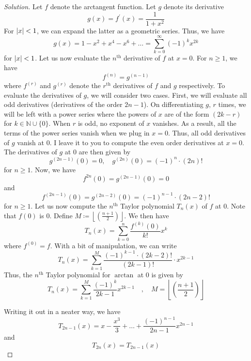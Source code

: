 \documentclass[12pt]{article}
\theoremstyle{definition}
\newenvironment{soln}{\begin{proof}[Solution]}{\end{proof}}
\begin{document}
\begin{enumerate}[leftmargin=*]
    \begin{soln}
        Let $f$ denote the arctangent function. Let $g$ denote its derivative
        \[
            g(x) = f^{\prime}(x) = \frac{1}{1+x^2}
        \]
        For $\abs{x} < 1$, we can expand the latter as a geometric series. Thus, we have
        \[
            g(x) = 1 - x^2 + x^4 - x^6 + \ldots = \sum_{k=0}^{\infty} (-1)^k x^{2k}
        \]
        for $\abs{x} < 1$. Let us now evaluate the $n^{\text{th}}$ derivative of $f$ at $x=0$. For $n \geq 1$, we have
        \[
            f^{(n)} = g^{(n-1)}
        \]
        where $f^{(r)}$ and $g^{(r)}$ denote the $r^{\text{th}}$ derivatives of $f$ and $g$ respectively. To evaluate the derivatives of $g$, we will consider two cases. First, we will evaluate all odd derivatives (derivatives of the order $2n-1$). On differentiating $g$, $r$ times, we will be left with a power series where the powers of $x$ are of the form $(2k-r)$ for $k \in \mathbb{N}\cup\{0\}$. When $r$ is odd, no exponent of $x$ vanishes. As a result, all the terms of the power series vanish when we plug in $x=0$. Thus, all odd derivatives of $g$ vanish at $0$. I leave it to you to compute the even order derivatives at $x=0$. The derivatives of $g$ at $0$ are then given by
        \[
            g^{(2n-1)}(0) = 0, \quad g^{(2n)}(0) = (-1)^n \cdot (2n)!
        \]
        for $n \geq 1$. Now, we have
        \[
            f^{2n}(0) = g^{(2n-1)}(0) = 0
        \]
        and
        \[
            f^{(2n-1)}(0) = g^{(2n-2)}(0) = (-1)^{n-1} \cdot (2n-2)!
        \]
        for $n \geq 1$. Let us now compute the $n^{\text{th}}$ Taylor polynomial $T_n(x)$ of $f$ at $0$. Note that $f(0)$ is $0$. Define $M \coloneqq \left\lfloor \left( \frac{n+1}{2} \right)  \right\rfloor$. We then have
        \[
            T_n(x) = \sum_{k=0}^{n} \frac{f^{(k)}(0)}{k!} x^k
        \]
        where $f^{(0)} = f$. With a bit of manipulation, we can write 
        \[
            T_n(x) = \sum_{k=1}^{M} \frac{(-1)^{k-1} \cdot (2k-2)!}{(2k-1)!} \cdot x^{2k-1}
        \]  
        Thus, the $n^{\text{th}}$ Taylor polynomial for $\arctan$ at $0$ is given by
        \[
            T_n(x) = \sum_{k=1}^{M} \frac{(-1)^k}{2k-1} x^{2k-1} \quad , \quad M = \left\lfloor \left( \frac{n+1}{2} \right) \right\rfloor
        \]
        
        Writing it out in a neater way, we have
        \[
            T_{2n-1}(x) = x - \frac{x^3}{3} + \ldots + \frac{(-1)^{n-1}}{2n-1} x^{2n-1} 
        \]
        and 
        \[
            T_{2n}(x) = T_{2n-1}(x)
        \]
        

\end{soln}
\end{enumerate}
\end{document}
